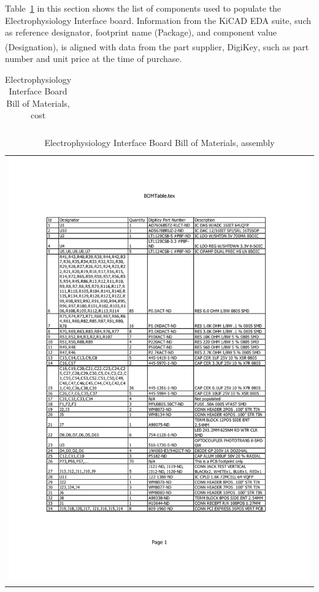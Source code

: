 \documentclass{article}
\begin{document}
Table~\ref{tab:bom} in this section shows the list of components used to populate the Electrophysiology Interface board.  Information from the KiCAD EDA suite, such as reference designator, footprint name (Package), and component value (Designation), is aligned with data from the part supplier, DigiKey\textsuperscript{\textregistered}, such as part number and unit price at the time of purchase.

\begin{landscape}
\renewcommand{\arraystretch}{1.3}
\begin{table}
\tiny
	\begin{tabular}{|l|p{0.9in}|l|l|l|p{1.1in}|p{2.1in}|r|r|}
	\hline
	
	\end{tabular}
\caption{Electrophysiology Interface Board Bill of Materials, cost\label{tab:bom} }
\end{table}
\renewcommand{\arraystretch}{1.0}
\end{landscape}

\begin{center}
\begin{table}[H]
\begin{tabular}{c}
	\includegraphics[page=1,trim=1in 1.7in 1.2in 1.5in,clip,width=\textwidth-0.25in ]{./figures/BOMTableLongForm} %
\end{tabular}
\caption{Electrophysiology Interface Board Bill of Materials, assembly\label{tab:boma} }
\end{table}
\end{center}
\end{document}
